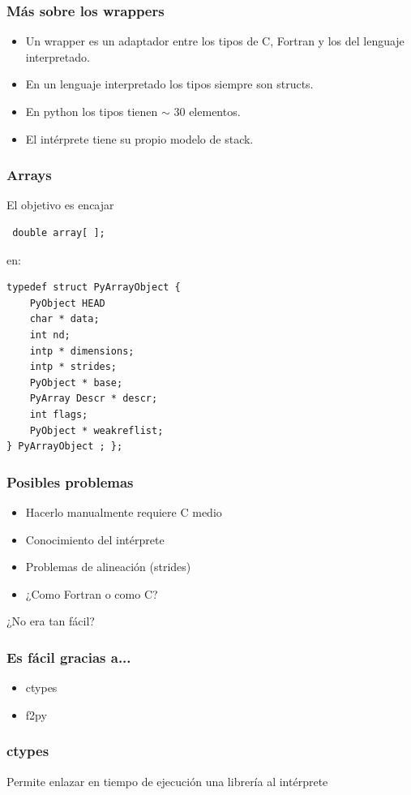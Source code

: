 \documentclass{beamer}
\begin{document}
\begin{frame}
\frametitle{Más sobre los wrappers}
\begin{itemize}
 \item Un wrapper es un adaptador entre los tipos de C, Fortran y los del lenguaje interpretado.
 \item En un lenguaje interpretado los tipos siempre son structs.
 \item En python los tipos tienen $\sim$ 30 elementos.
 \item El intérprete tiene su propio modelo de stack.
\end{itemize}
\end{frame}

\begin{frame}[containsverbatim]
 \frametitle{Arrays}
El objetivo es encajar
\begin{verbatim}
 double array[ ];
\end{verbatim}
en:
\begin{verbatim}
typedef struct PyArrayObject { 
    PyObject HEAD
    char * data;
    int nd;
    intp * dimensions;
    intp * strides;
    PyObject * base;
    PyArray Descr * descr;
    int flags;
    PyObject * weakreflist;
} PyArrayObject ; };
\end{verbatim}
\end{frame}

\begin{frame}
 \frametitle{Posibles problemas}
\begin{itemize}
 \item Hacerlo manualmente requiere C medio
 \item Conocimiento del intérprete
 \item Problemas de alineación (strides)
 \item ¿Como Fortran o como C?
\end{itemize}
\begin{center}
 ¿No era tan fácil?
\end{center}
\end{frame}

\begin{frame}
 \frametitle{Es fácil gracias a...}
\begin{itemize}
 \item ctypes
 \item f2py
\end{itemize}

\end{frame}

\begin{frame}
 \frametitle{ctypes}
Permite enlazar en tiempo de ejecución una librería al intérprete
\end{frame}
\end{document}
